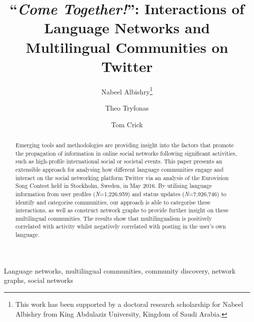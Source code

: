 \documentclass{llncs}
\begin{document}
\title{``{\emph{Come Together!}}'': Interactions of Language Networks and Multilingual Communities on Twitter}

\author{Nabeel Albishry\thanks{This work has been supported by a doctoral research scholarship for
Nabeel Albishry from King Abdulaziz University, Kingdom of Saudi
Arabia.} \and Theo Tryfonas \and Tom
  Crick}



\maketitle

\begin{abstract}
Emerging tools and methodologies are providing insight into the
factors that promote the propagation of information in online social
networks following significant activities, such as high-profile
international social or societal events. This paper presents an
extensible approach for analysing how different language communities
engage and interact on the social networking platform Twitter via an
analysis of the Eurovision Song Contest held in Stockholm, Sweden, in
May 2016.  By utilising language information from user profiles
({\emph{N}}=1,226,959) and status updates ({\emph{N}}=7,926,746) to
identify and categorise communities, our approach is able to
categorise these interactions, as well as construct network graphs to
provide further insight on these multilingual communities.  The
results show that multilingualism is positively correlated with
activity whilst negatively correlated with posting in the user's own
language.
 \end{abstract}

\begin{keywords}
Language networks, multilingual communities, community discovery,
network graphs, social networks
\end{keywords}
\end{document}
